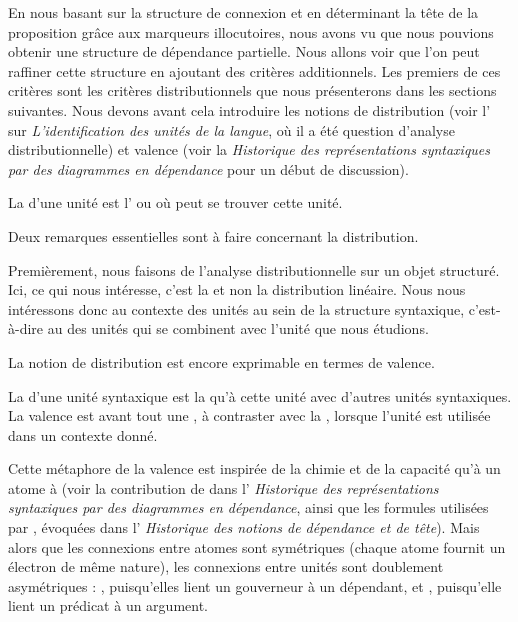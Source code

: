 En nous basant sur la structure de connexion et en déterminant la tête de la proposition grâce aux marqueurs illocutoires, nous avons vu que nous pouvions obtenir une structure de dépendance partielle. Nous allons voir que l’on peut raffiner cette structure en ajoutant des critères additionnels. Les premiers de ces critères sont les critères distributionnels que nous présenterons dans les sections suivantes. Nous devons avant cela introduire les notions de distribution (voir l' sur \textit{L’identification des unités de la langue}, où il a été question d’analyse distributionnelle) et valence (voir la  \textit{Historique des représentations syntaxiques par des diagrammes en dépendance} pour un début de discussion).

{La  d’une unité est l’ ou  où peut se trouver cette unité.}

Deux remarques essentielles sont à faire concernant la distribution.

Premièrement, nous faisons de l’analyse distributionnelle sur un objet structuré. Ici, ce qui nous intéresse, c’est la  et non la distribution linéaire. Nous nous intéressons donc au contexte des unités au sein de la structure syntaxique, c’est-à-dire au  des unités qui se combinent avec l’unité que nous étudions.

La notion de distribution est encore exprimable en termes de valence.

{La  d’une unité syntaxique est la  qu’à cette unité  avec d’autres unités syntaxiques. La valence est avant tout une , à contraster avec la , lorsque l’unité est utilisée dans un contexte donné.}

Cette métaphore de la valence est inspirée de la chimie et de la capacité qu’à un atome à  (voir la contribution de \citet{peirce1897logic} dans l’ \textit{Historique des représentations syntaxiques par des diagrammes en dépendance}, ainsi que les formules utilisées par \citet{jespersen1937analytic}, évoquées dans l’ \textit{Historique des notions de dépendance et de tête}). Mais alors que les connexions entre atomes sont symétriques (chaque atome fournit un électron de même nature), les connexions entre unités sont doublement asymétriques : , puisqu’elles lient un gouverneur à un dépendant, et , puisqu’elle lient un prédicat à un argument.

